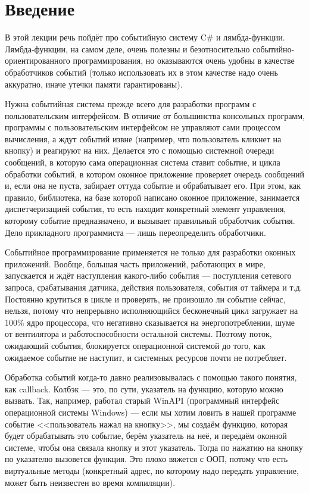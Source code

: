 \documentclass{../../text-style}
\begin{document}
\maketitle
\thispagestyle{empty}

\section{Введение}

В этой лекции речь пойдёт про событийную систему C\# и лямбда-функции. Лямбда-функции, на самом деле, очень полезны и безотносительно событийно-ориентированного программирования, но оказываются очень удобны в качестве обработчиков событий (только использовать их в этом качестве надо очень аккуратно, иначе утечки памяти гарантированы). 

Нужна событийная система прежде всего для разработки программ с пользовательским интерфейсом. В отличие от большинства консольных программ, программы с пользовательским интерфейсом не управляют сами процессом вычисления, а ждут событий извне (например, что пользователь кликнет на кнопку) и реагируют на них. Делается это с помощью системной очереди сообщений, в которую сама операционная система ставит событие, и цикла обработки событий, в котором оконное приложение проверяет очередь сообщений и, если она не пуста, забирает оттуда событие  и обрабатывает его. При этом, как правило, библиотека, на базе которой написано оконное приложение, занимается диспетчеризацией события, то есть находит конкретный элемент управления, которому событие предназначено, и вызывает правильный обработчик события. Дело прикладного программиста --- лишь переопределить обработчики.

Событийное программирование применяется не только для разработки оконных приложений. Вообще, большая часть приложений, работающих в мире, запускается и ждёт наступления какого-либо события --- поступления сетевого запроса, срабатывания датчика, действия пользователя, события от таймера и т.д. Постоянно крутиться в цикле и проверять, не произошло ли событие сейчас, нельзя, потому что непрерывно исполняющийся бесконечный цикл загружает на 100\% ядро процессора, что негативно сказывается на энергопотреблении, шуме от вентилятора и работоспособности остальной системы. Поэтому поток, ожидающий события, блокируется операционной системой до того, как ожидаемое событие не наступит, и системных ресурсов почти не потребляет.

Обработка событий когда-то давно реализовывалась с помощью такого понятия, как callback. Колбэк --- это, по сути, указатель на функцию, которую можно вызвать. Так, например, работал старый WinAPI (программный интерфейс операционной системы Windows) --- если мы хотим ловить в нашей программе событие <<пользователь нажал на кнопку>>, мы создаём функцию, которая будет обрабатывать это событие, берём указатель на неё, и передаём оконной системе, чтобы она связала кнопку и этот указатель. Тогда по нажатию на кнопку по указателю вызовется функция. Это плохо вяжется с ООП, потому что есть виртуальные методы (конкретный адрес, по которому надо передать управление, может быть неизвестен во время компиляции).
\end{document}
